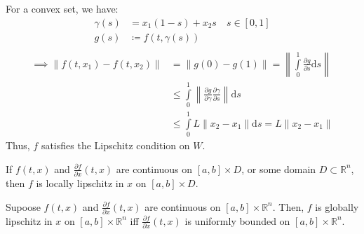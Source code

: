 \begin{lemmaproof}
    For a convex set, we have:
    \[
        \begin{aligned}
            \gamma (s) &= x_1(1-s) + x_2 s \quad s \in [0,1] \\
            g(s) &\coloneqq f(t, \gamma(s)) \\
        \end{aligned}
        \]
        \[
        \begin{aligned}
            \implies \lVert f(t,x_1) - f(t,x_2) \rVert &= \lVert g(0) - g(1) \rVert  = 
            \left\lVert \int\limits_{0}^{1} \frac{\partial g}{\partial s} \mathrm{d}s \right\rVert \\  
            &\leq \int\limits_{0}^{1} \left\lVert \frac{\partial g}{\partial \gamma } 
            \frac{\partial \gamma}{\partial s} \right\rVert \mathrm{d}s \\
            &\leq \int\limits_{0}^{1} L \lVert x_2 - x_1 \rVert \mathrm{d}s = L \lVert x_2 - x_1 \rVert
        \end{aligned}
    \]
    Thus, \(f\) satisfies the Lipschitz condition on \(W\).
\end{lemmaproof}
\begin{lemma}
    If \(f(t,x)\) and \(\frac{\partial f}{\partial x} (t,x)\) are continuous on \([a,b] \times D\), or some
    domain \(D \subset \mathbb{R}^n\), then \(f\) is locally lipschitz in \(x\) on \([a,b] \times D\). 
\end{lemma}
\begin{lemma}
    Supoose \(f(t,x)\) and \(\frac{\partial f}{\partial x} (t,x)\) are continuous on \([a,b] \times \mathbb{R} ^n\).
    Then, \(f\) is globally lipschitz in \(x\) on \([a,b] \times \mathbb{R} ^n\) iff 
    \(\frac{\partial f}{\partial x} (t,x)\) is uniformly bounded on \([a,b] \times \mathbb{R} ^n\).
\end{lemma}

